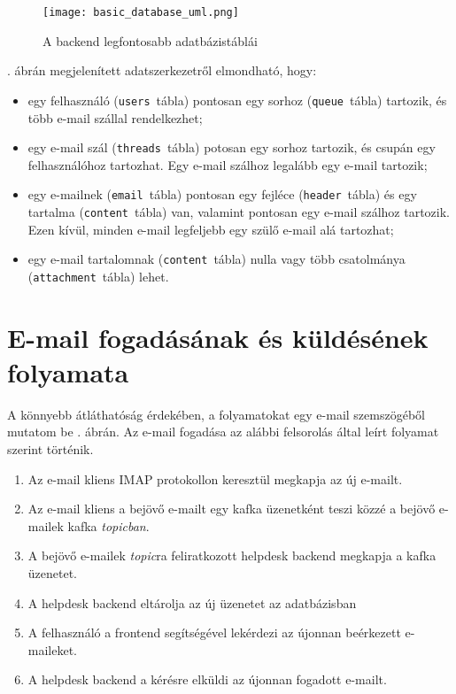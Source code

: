  \begin{figure}[hbt] 
 	\centering
 	\texttt{[image: basic\_database\_uml.png]}
 	\caption{A backend legfontosabb adatbázistáblái}
 	\label{fig:basic_database_uml}
 \end{figure}


. ábrán megjelenített adatszerkezetről elmondható, hogy:
\begin{itemize}
	\item egy felhasználó (\texttt{users}~tábla) pontosan egy sorhoz (\texttt{queue}~tábla) tartozik, és több e-mail szállal rendelkezhet;
	
	\item egy e-mail szál (\texttt{threads}~tábla) potosan egy sorhoz tartozik, és csupán egy felhasználóhoz tartozhat. Egy e-mail szálhoz legalább egy e-mail tartozik;
	
	\item egy e-mailnek (\texttt{email}~tábla) pontosan egy fejléce (\texttt{header}~tábla) és egy tartalma (\texttt{content}~tábla) van, valamint pontosan egy  e-mail szálhoz tartozik. Ezen kívül, minden e-mail legfeljebb egy szülő e-mail alá tartozhat;

	\item egy e-mail tartalomnak (\texttt{content}~tábla) nulla vagy több csatolmánya (\texttt{attachment}~tábla) lehet.
\end{itemize}



\section{E-mail fogadásának és küldésének folyamata}
A könnyebb átláthatóság érdekében, a folyamatokat egy e-mail szemszögéből mutatom be . ábrán. Az e-mail fogadása az alábbi felsorolás által leírt folyamat szerint történik.
\begin{enumerate}
	\item Az e-mail kliens IMAP protokollon keresztül megkapja az új e-mailt.
	\item Az e-mail kliens a bejövő e-mailt egy kafka üzenetként teszi közzé a bejövő e-mailek kafka \emph{topicban}.
	\item A bejövő e-mailek \emph{topic}ra feliratkozott helpdesk backend megkapja a kafka üzenetet.
	\item A helpdesk backend eltárolja az új üzenetet az adatbázisban
	\item A felhasználó a frontend segítségével lekérdezi az újonnan beérkezett e-maileket.
	\item A helpdesk backend a kérésre elküldi az újonnan fogadott e-mailt.
\end{enumerate}

